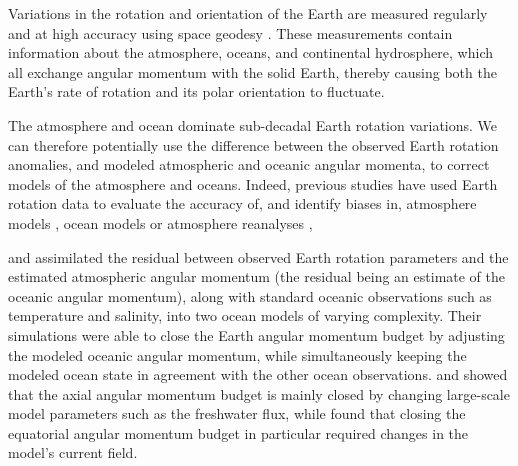
Variations in the rotation and orientation of the Earth are measured regularly and at high accuracy using space geodesy \citep{Gross1992,iers}. 
These measurements contain information about the atmosphere, oceans, and continental hydrosphere, which all exchange angular momentum with the solid Earth, thereby causing both the Earth's rate of rotation and its polar orientation to fluctuate. 

The atmosphere and ocean dominate sub-decadal Earth rotation variations. 
We can therefore potentially use the difference between the observed Earth rotation anomalies, and modeled atmospheric and oceanic angular momenta, to correct models of the atmosphere and oceans. 
Indeed, previous studies have used Earth rotation data to evaluate the accuracy of, 
and identify biases in, atmosphere models \citep{Boer1990, Rosen2000}, ocean 
models \citep{Gross1996a} or atmosphere reanalyses \citep{Yu1999, Aoyama2000, 
Paek2012a,Berrisford2011},

\citet{Saynisch2010,Saynisch2011} and \citet{Saynisch2012} assimilated the residual between observed Earth rotation parameters and the estimated atmospheric angular momentum (the residual being an estimate of the oceanic angular momentum), along with standard oceanic observations such as temperature and salinity, into two ocean models of varying complexity. 
Their simulations were able to close the Earth angular momentum budget by adjusting the modeled oceanic angular momentum, while simultaneously keeping the modeled ocean state in agreement with the other ocean observations.  
\citet{Saynisch2010} and \citet{Saynisch2012} showed that the axial angular momentum budget is mainly closed by changing large-scale model parameters such as the freshwater flux, while \citet{Saynisch2011} found that closing the equatorial angular momentum budget in particular required changes in the model's current field. 


